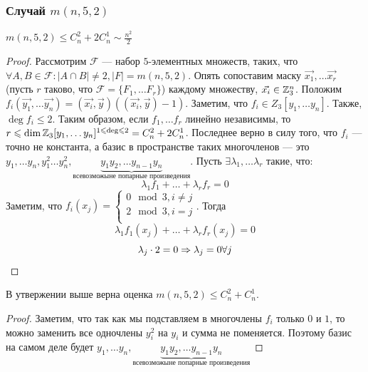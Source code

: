 \subsubsection{Случай \(m(n, 5, 2)\)}
\begin{proposition}
    \(m(n, 5, 2) \le C_n^2 + 2C_n^1 \sim \frac{n^2}{2}\)
\end{proposition}
\begin{proof}
    Рассмотрим \(\mathcal{F}\) --- набор \(5\)-элементных множеств, таких, что \(\forall A, B \in \mathcal{F}: |A \cap B| \ne 2, |F| = m(n, 5, 2)\). Опять сопоставим маску \(\vec{x_1}, \dots \vec{x_r}\) (пусть \(r\) таково, что \(\mathcal{F} = \{F_1, \dots F_r\}\)) каждому множеству, \(\vec{x_i} \in \mathbb{Z}_3^n\). Положим \(f_i(\vec{y_1}, \dots \vec{y_n}) = (\vec{x_i}, \vec{y}) ((\vec{x_i}, \vec{y}) - 1)\). Заметим, что \(f_i \in Z_3[y_1, \dots y_n]\). Также, \(\deg f_i \le 2\). Таким образом, если \(f_1, \dots f_r\) линейно независимы, то \(r \leqslant \dim \mathbb{Z}_3[y_1, \dots y_n]^{1 \leqslant \deg \leqslant 2} = C_n^2 + 2C_n^1\).  Последнее верно в силу того, что \(f_i\) --- точно не константа, а базис в пространстве таких многочленов --- это \(y_1, \dots y_n, y_1^2 \dots y_n^2, \underbrace{y_1y_2, \dots y_{n - 1}y_{n}}_{\text{всевозможыне попарные произведения}}\).
    Пусть \(\exists \lambda_1, \dots \lambda_r\) такие, что:
    \[\lambda_1 f_1 + \dots + \lambda_r f_r = 0\]
    Заметим, что \(f_i(x_j) = \left\{\begin{array}{l}
        0 \mod 3, i \ne j \\
        2 \mod 3, i = j \\
    \end{array}\right.\). Тогда
    \[\lambda_1 f_1(x_j) + \dots + \lambda_r f_r(x_j) = 0\]
    \[\lambda_j \cdot 2 = 0 \Rightarrow \lambda_j = 0 \forall j\]
\end{proof}

\begin{note}
    В утвержении выше верна оценка \(m(n, 5, 2) \le C_n^2 + C_n^1\).
\end{note}
\begin{proof}
    Заметим, что так как мы подставляем в многочлены \(f_i\) только \(0\) и \(1\), то можно заменить все одночлены \(y_i^2\) на \(y_i\) и сумма не поменяется. Поэтому базис на самом деле будет  \(y_1, \dots y_n, \underbrace{y_1y_2, \dots y_{n - 1}y_{n}}_{\text{всевозможыне попарные произведения}}\)
\end{proof}


